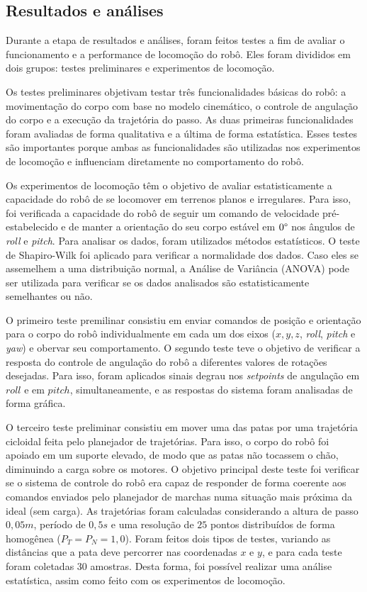 \documentclass[../main.tex]{subfiles}
\begin{document}
  \subsection{Resultados e análises}
  \label{sec:method_results_analysis}
  Durante a etapa de resultados e análises, foram feitos testes a fim de avaliar o funcionamento e a performance de locomoção do robô. Eles foram divididos em dois grupos: testes preliminares e experimentos de locomoção. 
  
  Os testes preliminares objetivam testar três funcionalidades básicas do robô: a movimentação do corpo com base no modelo cinemático, o controle de angulação do corpo e a execução da trajetória do passo. As duas primeiras funcionalidades foram avaliadas de forma qualitativa e a última de forma estatística. Esses testes são importantes porque ambas as funcionalidades são utilizadas nos experimentos de locomoção e influenciam diretamente no comportamento do robô. 

  Os experimentos de locomoção têm o objetivo de avaliar estatisticamente a capacidade do robô de se locomover em terrenos planos e irregulares. Para isso, foi verificada a capacidade do robô de seguir um comando de velocidade pré-estabelecido e de manter a orientação do seu corpo estável em $0\degree$ nos ângulos de \textit{roll} e \textit{pitch}. Para analisar os dados, foram utilizados métodos estatísticos. O teste de Shapiro-Wilk \cite{leotti2005comparaccao} foi aplicado para verificar a normalidade dos dados. Caso eles se assemelhem a uma distribuição normal, a Análise de Variância (ANOVA) \cite{cano2012six} pode ser utilizada para verificar se os dados analisados são estatisticamente semelhantes ou não.

  O primeiro teste premilinar consistiu em enviar comandos de posição e orientação para o corpo do robô individualmente em cada um dos eixos ($x, y, z$, \textit{roll}, \textit{pitch} e \textit{yaw}) e obervar seu comportamento. O segundo teste teve o objetivo de verificar a resposta do controle de angulação do robô a diferentes valores de rotações desejadas. Para isso, foram aplicados sinais degrau nos \textit{setpoints} de angulação em $roll$ e em $pitch$, simultaneamente, e as respostas do sistema foram analisadas de forma gráfica.
  
  O terceiro teste preliminar consistiu em mover uma das patas por uma trajetória cicloidal feita pelo planejador de trajetórias. Para isso, o corpo do robô foi apoiado em um suporte elevado, de modo que as patas não tocassem o chão, diminuindo a carga sobre os motores. O objetivo principal deste teste foi verificar se o sistema de controle do robô era capaz de responder de forma coerente aos comandos enviados pelo planejador de marchas numa situação mais próxima da ideal (sem carga). As trajetórias foram calculadas considerando a altura de passo $0,05 m$, período de $0,5 s$ e uma resolução de $25$ pontos distribuídos de forma homogênea ($P_T = P_N = 1,0$). Foram feitos dois tipos de testes, variando as distâncias que a pata deve percorrer nas coordenadas $x$ e $y$, e para cada teste foram coletadas 30 amostras. Desta forma, foi possível realizar uma análise estatística, assim como feito com os experimentos de locomoção.
  
\end{document}
